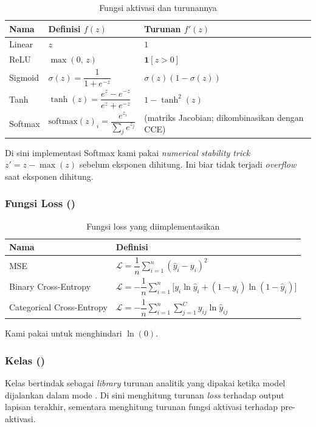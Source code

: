 \begin{table}[H]
\centering
\caption{Fungsi aktivasi dan turunannya}
\begin{tabular}{lll}
\toprule
\textbf{Nama} & \textbf{Definisi} $f(z)$ & \textbf{Turunan} $f'(z)$ \\
\midrule
Linear   & $z$ & $1$ \\
ReLU     & $\max(0,\, z)$ & $\mathbf{1}[z > 0]$ \\
Sigmoid  & $\sigma(z) = \dfrac{1}{1+e^{-z}}$ & $\sigma(z)(1-\sigma(z))$ \\
Tanh     & $\tanh(z) = \dfrac{e^z - e^{-z}}{e^z + e^{-z}}$ & $1 - \tanh^2(z)$ \\
Softmax  & $\text{softmax}(z)_i = \dfrac{e^{z_i}}{\sum_j e^{z_j}}$ & (matriks Jacobian; dikombinasikan dengan CCE) \\
\bottomrule
\end{tabular}
\end{table}

Di sini implementasi Softmax kami pakai \textit{numerical stability trick}
$z' = z - \max(z)$ sebelum eksponen dihitung. Ini biar tidak terjadi \textit{overflow} saat eksponen dihitung.

\subsubsection{Fungsi Loss ()}

\begin{table}[H]
\centering
\caption{Fungsi loss yang diimplementasikan}
\begin{tabular}{ll}
\toprule
\textbf{Nama} & \textbf{Definisi} \\
\midrule
MSE &
$\mathcal{L} = \dfrac{1}{n}\displaystyle\sum_{i=1}^n (\hat{y}_i - y_i)^2$ \\[8pt]
Binary Cross-Entropy &
$\mathcal{L} = -\dfrac{1}{n}\displaystyle\sum_{i=1}^n \bigl[y_i \ln\hat{y}_i + (1-y_i)\ln(1-\hat{y}_i)\bigr]$ \\[8pt]
Categorical Cross-Entropy &
$\mathcal{L} = -\dfrac{1}{n}\displaystyle\sum_{i=1}^n\sum_{j=1}^C y_{ij}\ln\hat{y}_{ij}$ \\
\bottomrule
\end{tabular}
\end{table}

Kami pakai  untuk menghindari $\ln(0)$.

\subsubsection{Kelas  ()}
Kelas  bertindak sebagai \textit{library} turunan analitik yang dipakai ketika model dijalankan dalam mode . Di sini  menghitung turunan \textit{loss} terhadap output lapisan terakhir, sementara  menghitung turunan fungsi aktivasi terhadap pre-aktivasi. 

